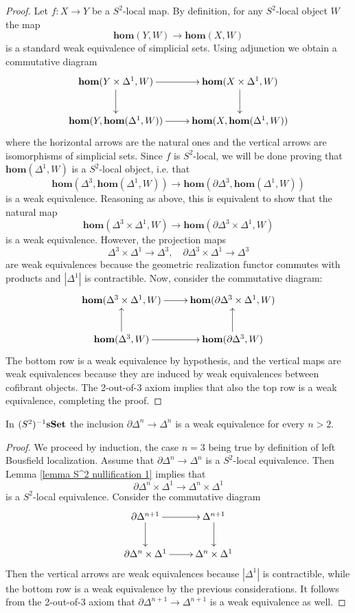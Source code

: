 \begin{refsection}
\begin{proof}
Let $f \colon X \to Y$ be a $S^2$-local map. By definition, for any $S^2$-local object $W$ the map
\[
\mathbf{hom}(Y,W) \to \mathbf{hom}(X,W)
\]
is a standard weak equivalence of simplicial sets. Using adjunction we obtain a commutative diagram
\[
\xymatrix{
\mathbf{hom}(Y \times \Delta^1, W) \ar[d] \ar[r] & \mathbf{hom}(X \times \Delta^1, W) \ar[d] \\ \mathbf{hom}(Y, \mathbf{hom}(\Delta^1, W)) \ar[r] & \mathbf{hom}(X, \mathbf{hom}(\Delta^1,W))
}
\]
where the horizontal arrows are the natural ones and the vertical arrows are isomorphisms of simplicial sets. Since $f$ is $S^2$-local, we will be done proving that $\mathbf{hom}(\Delta^1,W)$ is a $S^2$-local object, i.e. that
\[
\mathbf{hom}(\Delta^3, \mathbf{hom}(\Delta^1, W)) \to \mathbf{hom}(\partial \Delta^3, \mathbf{hom}(\Delta^1, W))
\]
is a weak equivalence. Reasoning as above, this is equivalent to show that the natural map
\[
\mathbf{hom}(\Delta^3 \times \Delta^1, W) \to \mathbf{hom}(\partial \Delta^3 \times \Delta^1, W)
\]
is a weak equivalence. However, the projection maps
\[
\Delta^3 \times \Delta^1 \to \Delta^3, \quad \partial \Delta^3 \times \Delta^1 \to \Delta^3
\]
are weak equivalences because the geometric realization functor commutes with products and $|\Delta^1|$ is contractible. Now, consider the commutative diagram:
\[
\xymatrix{
\mathbf{hom}(\Delta^3 \times \Delta^1, W) \ar[r] & \mathbf{hom}(\partial \Delta^3 \times \Delta^1, W) \\ \mathbf{hom}(\Delta^3, W) \ar[u] \ar[r] & \mathbf{hom}(\partial \Delta^3, W) \ar[u]
}
\]
The bottom row is a weak equivalence by hypothesis, and the vertical maps are weak equivalences because they are induced by weak equivalences between cofibrant objects. The 2-out-of-3 axiom implies that also the top row is a weak equivalence, completing the proof.
\end{proof}

\begin{lemma} \label{lemma S^2 nullification 2}
In $(S^2)^{-1} \mathbf{s\,\!\mathbf{Set}}$ the inclusion $\partial \Delta^n \to \Delta^n$ is a weak equivalence for every $n > 2$.
\end{lemma}

\begin{proof}
We proceed by induction, the case $n = 3$ being true by definition of left Bousfield localization. Assume that $\partial \Delta^n \to \Delta^n$ is a $S^2$-local equivalence. Then Lemma \ref{lemma S^2 nullification 1} implies that
\[
\partial \Delta^n \times \Delta^1 \to \Delta^n \times \Delta^1
\]
is a $S^2$-local equivalence. Consider the commutative diagram
\[
\xymatrix{
\partial \Delta^{n+1} \ar[r] \ar[d] & \Delta^{n+1} \ar[d] \\ \partial \Delta^n \times \Delta^1 \ar[r] & \Delta^n \times \Delta^1
}
\]
Then the vertical arrows are weak equivalences because $|\Delta^1|$ is contractible, while the bottom row is a weak equivalence by the previous considerations. It follows from the 2-out-of-3 axiom that $\partial \Delta^{n+1} \to \Delta^{n+1}$ is a weak equivalence as well.
\end{proof}


\end{refsection}

